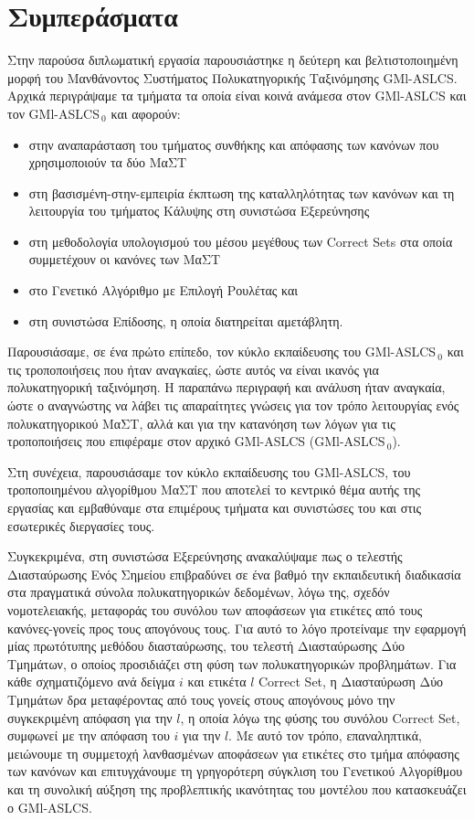 \chapter{Συμπεράσματα}
\label{conclusions}
Στην παρούσα διπλωματική εργασία παρουσιάστηκε η δεύτερη και βελτιστοποιημένη μορφή του Μανθάνοντος Συστήματος Πολυκατηγορικής Ταξινόμησης GMl-ASLCS. Αρχικά περιγράψαμε τα τμήματα τα οποία είναι κοινά ανάμεσα στον GMl-ASLCS και τον GMl-ASLCS$_{\:0}$ και αφορούν:

\begin{itemize}
\item στην αναπαράσταση του τμήματος συνθήκης και απόφασης των κανόνων που χρησιμοποιούν τα δύο ΜαΣΤ

\item στη βασισμένη-στην-εμπειρία έκπτωση της καταλληλότητας των κανόνων και τη λειτουργία του τμήματος Κάλυψης στη συνιστώσα Εξερεύνησης

\item στη μεθοδολογία υπολογισμού του μέσου μεγέθους των Correct Sets στα οποία συμμετέχουν οι κανόνες των ΜαΣΤ

\item στο Γενετικό Αλγόριθμο με Επιλογή Ρουλέτας και

\item στη συνιστώσα Επίδοσης, η οποία διατηρείται αμετάβλητη.
\end{itemize}

Παρουσιάσαμε, σε ένα πρώτο επίπεδο, τον κύκλο εκπαίδευσης του GMl-ASLCS$_{\:0}$ και τις τροποποιήσεις που ήταν αναγκαίες, ώστε αυτός να είναι ικανός για πολυκατηγορική ταξινόμηση. Η παραπάνω περιγραφή και ανάλυση ήταν αναγκαία, ώστε ο αναγνώστης να λάβει τις απαραίτητες γνώσεις για τον τρόπο λειτουργίας ενός πολυκατηγορικού ΜαΣΤ, αλλά και για την κατανόηση των λόγων για τις τροποποιήσεις που επιφέραμε στον αρχικό GMl-ASLCS (GMl-ASLCS$_{\:0}$).

Στη συνέχεια, παρουσιάσαμε τον κύκλο εκπαίδευσης του GMl-ASLCS, του τροποποιημένου αλγορίθμου ΜαΣΤ που αποτελεί το κεντρικό θέμα αυτής της εργασίας και εμβαθύναμε στα επιμέρους τμήματα και συνιστώσες του και στις εσωτερικές διεργασίες τους. 

Συγκεκριμένα, στη συνιστώσα Εξερεύνησης ανακαλύψαμε πως ο τελεστής Διασταύρωσης Ενός Σημείου επιβραδύνει σε ένα βαθμό την εκπαιδευτική διαδικασία στα πραγματικά σύνολα πολυκατηγορικών δεδομένων, λόγω της, σχεδόν νομοτελειακής, μεταφοράς του συνόλου των αποφάσεων για ετικέτες από τους κανόνες-γονείς προς τους απογόνους τους. Για αυτό το λόγο προτείναμε την εφαρμογή μίας πρωτότυπης μεθόδου διασταύρωσης, του τελεστή Διασταύρωσης Δύο Τμημάτων, ο οποίος προσιδιάζει στη φύση των πολυκατηγορικών προβλημάτων. Για κάθε σχηματιζόμενο ανά δείγμα $i$ και ετικέτα $l$ Correct Set, η Διασταύρωση Δύο Τμημάτων δρα μεταφέροντας από τους γονείς στους απογόνους μόνο την συγκεκριμένη απόφαση για την $l$, η οποία λόγω της φύσης του συνόλου Correct Set, συμφωνεί με την απόφαση του $i$ για την $l$. Με αυτό τον τρόπο, επαναληπτικά, μειώνουμε τη συμμετοχή λανθασμένων αποφάσεων για ετικέτες στο τμήμα απόφασης των κανόνων και επιτυγχάνουμε τη γρηγορότερη σύγκλιση του Γενετικού Αλγορίθμου και τη συνολική αύξηση της προβλεπτικής ικανότητας του μοντέλου που κατασκευάζει ο GMl-ASLCS.

